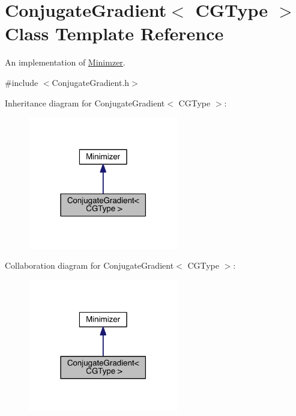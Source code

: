 \hypertarget{classConjugateGradient}{\section{Conjugate\+Gradient$<$ C\+G\+Type $>$ Class Template Reference}
\label{classConjugateGradient}
}


An implementation of \hyperlink{classMinimizer}{Minimzer}.  




{\ttfamily \#include $<$Conjugate\+Gradient.\+h$>$}



Inheritance diagram for Conjugate\+Gradient$<$ C\+G\+Type $>$\+:\nopagebreak
\begin{figure}[H]
\begin{center}
\leavevmode
\includegraphics[width=186pt]{classConjugateGradient__inherit__graph}
\end{center}
\end{figure}


Collaboration diagram for Conjugate\+Gradient$<$ C\+G\+Type $>$\+:\nopagebreak
\begin{figure}[H]
\begin{center}
\leavevmode
\includegraphics[width=186pt]{classConjugateGradient__coll__graph}
\end{center}
\end{figure}
